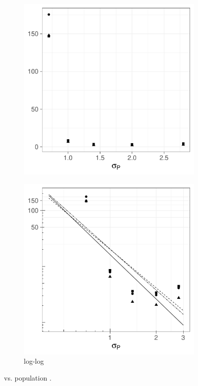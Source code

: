 \begin{figure}[htbp]
    \begin{subfigure}[t]{0.49\textwidth}
        \includegraphics[width=\textwidth]{results/by_population_spread/NMISE-vs-population-spread}
        \caption{}
        \label{fig:ise:pop_spread:nmise}
    \end{subfigure}
    \begin{subfigure}[t]{0.49\textwidth}
        \includegraphics[width=\textwidth]{results/by_population_spread/NMISE-vs-population-spread-log-log}
        \caption{ log-log}
        \label{fig:ise:pop_spread:nmise_log_log}
    \end{subfigure}
    \caption[: by population ]{ vs. population . \errorplotcaption}
    \label{fig:ise:pop_spread}
\end{figure}

